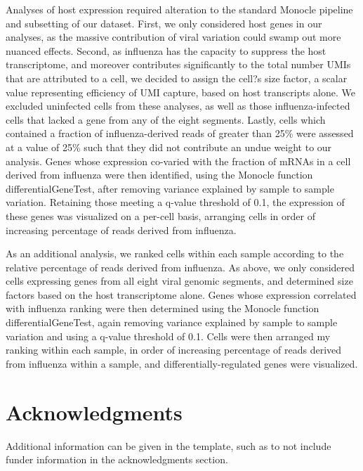 \documentclass[9pt,lineno]{elife}
\begin{document}
Analyses of host expression required alteration to the standard Monocle pipeline and subsetting of our dataset.
First, we only considered host genes in our analyses, as the massive contribution of viral variation could swamp out more nuanced effects.
Second, as influenza has the capacity to suppress the host transcriptome, and moreover contributes significantly to the total number UMIs that are attributed to a cell, we decided to assign the cell?s size factor, a scalar value representing efficiency of UMI capture, based on host transcripts alone. 
We excluded uninfected cells from these analyses, as well as those influenza-infected cells that lacked a gene from any of the eight segments. 
Lastly, cells which contained a fraction of influenza-derived reads of greater than 25\% were assessed at a value of 25\% such that they did not contribute an undue weight to our analysis. 
Genes whose expression co-varied with the fraction of mRNAs in a cell derived from influenza were then identified, using the Monocle function differentialGeneTest, after removing variance explained by sample to sample variation. 
Retaining those meeting a q-value threshold of 0.1, the expression of these genes was visualized on a per-cell basis, arranging cells in order of increasing percentage of reads derived from influenza.

As an additional analysis, we ranked cells within each sample according to the relative percentage of reads derived from influenza.
As above, we only considered cells expressing genes from all eight viral genomic segments, and determined size factors based on the host transcriptome alone.
Genes whose expression correlated with influenza ranking were then determined using the Monocle function differentialGeneTest, again removing variance explained by sample to sample variation and using a q-value threshold of 0.1. 
Cells were then arranged my ranking within each sample, in order of increasing percentage of reads derived from influenza within a sample, and differentially-regulated genes were visualized.


\section{Acknowledgments}

Additional information can be given in the template, such as to not include funder information in the acknowledgments section.

\nocite{*} %

\end{document}
